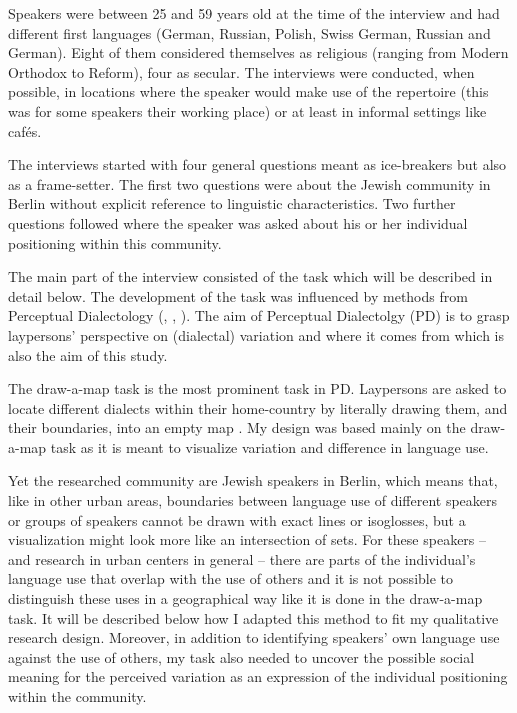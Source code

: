 \documentclass[output=paper]{langscibook}
\begin{document}
Speakers were between 25 and 59 years old at the time of the interview and had different first languages (German, Russian, Polish, Swiss German, Russian and German). Eight of them considered themselves as religious (ranging from Modern Orthodox to Reform), four as secular. The interviews were conducted, when possible, in locations where the speaker would make use of the repertoire (this was for some speakers their working place) or at least in informal settings like cafés.

The interviews started with four general questions meant as ice-breakers but also as a frame-setter. The first two questions were about the Jewish community in Berlin without explicit reference to linguistic characteristics. Two further questions followed where the speaker was asked about his or her individual positioning within this community.

The main part of the interview consisted of the task which will be described in detail below. The development of the task was influenced by methods from Perceptual Dialectology (\citealt{Cramer2016a}, \citealt{Preston1999}, \citealt{Preston2010a}). The aim of Perceptual Dialectolgy (PD) is to grasp laypersons’ perspective on (dialectal) variation and where it comes from \citep[1]{Cramer2016a} which is also the aim of this study.

The draw-a-map task is the most prominent task in PD. Laypersons are asked to locate different dialects within their home-country by literally drawing them, and their boundaries, into an empty map \citep[XXXIV]{Preston1999}. My design was based mainly on the draw-a-map task as it is meant to visualize variation and difference in language use.

Yet the researched community are Jewish speakers in Berlin, which means that, like in other urban areas, boundaries between language use of different speakers or groups of speakers cannot be drawn with exact lines or isoglosses, but a visualization might look more like an intersection of sets. For these speakers – and research in urban centers in general – there are parts of the individual’s language use that overlap with the use of others and it is not possible to distinguish these uses in a geographical way like it is done in the draw-a-map task. It will be described below how I adapted this method to fit my qualitative research design. Moreover, in addition to identifying speakers’ own language use against the use of others, my task also needed to uncover the possible social meaning for the perceived variation as an expression of the individual positioning within the community.
\end{document}
